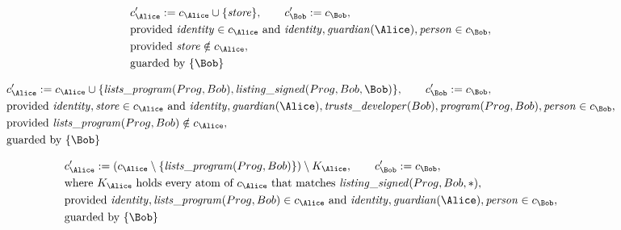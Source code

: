 \begin{align*}
&
c'_
{
\Alice
}
 := 
c_
{
\Alice
}
 \cup 
\{
\mathit{\detokenize{
store
}}
\}
, \qquad 
c'_
{
\Bob
}
 := 
c_
{
\Bob
}
,\\
&
\text{provided } 
\mathit{\detokenize{
identity
}}
 \in c_
{
\Alice
}
 \text{ and } 
\mathit{\detokenize{
identity
}}
,
\mathit{\detokenize{
guardian
}}
(
\Alice
)
,
\mathit{\detokenize{
person
}}
 \in c_
{
\Bob
}
,\\
&
\text{provided } 
\mathit{\detokenize{
store
}}
 \notin c_
{
\Alice
}
,\\
&
\text{guarded by } \{
\Bob
\}
\end{align*}

\begin{align*}
&
c'_
{
\Alice
}
 := 
c_
{
\Alice
}
 \cup 
\{
\mathit{\detokenize{
lists_program
}}
(
Prog
,
Bob
)
,
\mathit{\detokenize{
listing_signed
}}
(
Prog
,
Bob
,
\Bob
)
\}
, \qquad 
c'_
{
\Bob
}
 := 
c_
{
\Bob
}
,\\
&
\text{provided } 
\mathit{\detokenize{
identity
}}
,
\mathit{\detokenize{
store
}}
 \in c_
{
\Alice
}
 \text{ and } 
\mathit{\detokenize{
identity
}}
,
\mathit{\detokenize{
guardian
}}
(
\Alice
)
,
\mathit{\detokenize{
trusts_developer
}}
(
Bob
)
,
\mathit{\detokenize{
program
}}
(
Prog
,
Bob
)
,
\mathit{\detokenize{
person
}}
 \in c_
{
\Bob
}
,\\
&
\text{provided } 
\mathit{\detokenize{
lists_program
}}
(
Prog
,
Bob
)
 \notin c_
{
\Alice
}
,\\
&
\text{guarded by } \{
\Bob
\}
\end{align*}

\begin{align*}
&
c'_
{
\Alice
}
 := 
(c_
{
\Alice
}
 \setminus 
\{
\mathit{\detokenize{
lists_program
}}
(
Prog
,
Bob
)
\}
) \setminus K_
{
\Alice
}
, \qquad 
c'_
{
\Bob
}
 := 
c_
{
\Bob
}
,\\
&
\text{where } K_
{
\Alice
}
 \text{ holds every atom of } c_
{
\Alice
}
 \text{ that matches } 
\mathit{\detokenize{
listing_signed
}}
(
Prog
,
Bob
,
\ast
)
,\\
&
\text{provided } 
\mathit{\detokenize{
identity
}}
,
\mathit{\detokenize{
lists_program
}}
(
Prog
,
Bob
)
 \in c_
{
\Alice
}
 \text{ and } 
\mathit{\detokenize{
identity
}}
,
\mathit{\detokenize{
guardian
}}
(
\Alice
)
,
\mathit{\detokenize{
person
}}
 \in c_
{
\Bob
}
,\\
&
\text{guarded by } \{
\Bob
\}
\end{align*}

